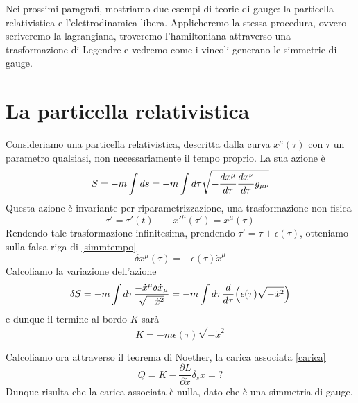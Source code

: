     Nei prossimi paragrafi, mostriamo due esempi di teorie di gauge: la particella relativistica e l'elettrodinamica libera. Applicheremo la stessa procedura, ovvero scriveremo la lagrangiana, troveremo l'hamiltoniana attraverso una trasformazione di Legendre e vedremo come i vincoli generano le simmetrie di gauge. 

\section{La particella relativistica}

    Consideriamo una particella relativistica, descritta dalla curva $x^\mu(\tau)$ con $\tau$ un parametro qualsiasi, non necessariamente il tempo proprio. La sua azione è
\begin{equation} \label{azionerel}
    S = -m \int ds = - m \int d\tau \sqrt{- \frac{dx^\mu}{d\tau}\frac{dx^\nu}{d\tau} g_{\mu\nu}}
\end{equation}
    Questa azione è invariante per riparametrizzazione, una trasformazione non fisica 
\begin{equation*}
    \tau' = \tau'(t) \qquad x'^\mu (\tau') = x^\mu(\tau)
\end{equation*} 
    Rendendo tale trasformazione infinitesima, prendendo $\tau' = \tau + \epsilon(\tau)$, otteniamo sulla falsa riga di \eqref{simmtempo}
\begin{equation*}
    \delta x^\mu(\tau) = - \epsilon(\tau) \dot x^\mu
\end{equation*}
    Calcoliamo la variazione dell'azione 
\begin{equation*}
    \delta S = - m \int d\tau \frac{- \dot x^\mu \delta \dot x_\mu}{\sqrt{- \dot x^2}} = - m \int d\tau \frac{d}{d\tau} \Big ( \epsilon(\tau) \sqrt{- \dot x^2} \Big)
\end{equation*}
    e dunque il termine al bordo $K$ sarà 
\begin{equation*}
    K = - m \epsilon(\tau) \sqrt{- \dot x^2}
\end{equation*}

    Calcoliamo ora attraverso il teorema di Noether, la carica associata \eqref{carica}
\begin{equation*}
    Q = K - \frac{\partial L}{\partial \dot x} \delta_s x = ?
\end{equation*}
    Dunque risulta che la carica associata è nulla, dato che è una simmetria di gauge. 

